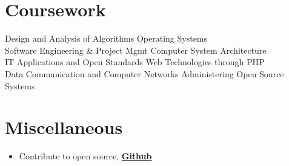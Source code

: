 \documentclass[]{friggeri-cv}
\begin{document}
\section{Coursework}
\begin{flushleft}
    Design and Analysis of Algorithms   \hspace{3cm} 
    Operating Systems\\ 
    Software Engineering \& Project Mgmt \hspace{2.45cm} Computer System Architecture \\  
    IT Applications and Open Standards \hspace{2.67cm} Web Technologies through PHP \\
    Data Communication and Computer Networks \hspace{1.15cm} Administering Open Source Systems

\end{flushleft}
 
\section{Miscellaneous}
\begin{itemize}
    \item Contribute to open source, \href{https://github.com/ritwik12}{{\textbf{Github}}}
\end{itemize}


 













% 
\end{document}
